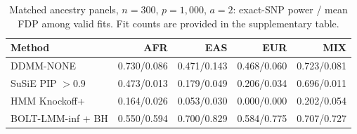 \begin{table}[htbp]\centering\small
\caption{Matched ancestry panels, $n=300$, $p=1{,}000$, $a=2$: exact-SNP power / mean FDP among valid fits. Fit counts are provided in the supplementary table.}
\label{tab:ancestry300-snp}
\begin{tabular}{lrrrr}\toprule
Method & AFR & EAS & EUR & MIX\\\midrule
DDMM-NONE & 0.730/0.086 & 0.471/0.143 & 0.468/0.060 & 0.723/0.081\\
SuSiE PIP $>0.9$ & 0.473/0.013 & 0.179/0.049 & 0.206/0.034 & 0.696/0.011\\
HMM Knockoff+ & 0.164/0.026 & 0.053/0.030 & 0.000/0.000 & 0.202/0.054\\
BOLT-LMM-inf + BH & 0.550/0.594 & 0.700/0.829 & 0.584/0.775 & 0.707/0.727\\
\bottomrule\end{tabular}
\end{table}
